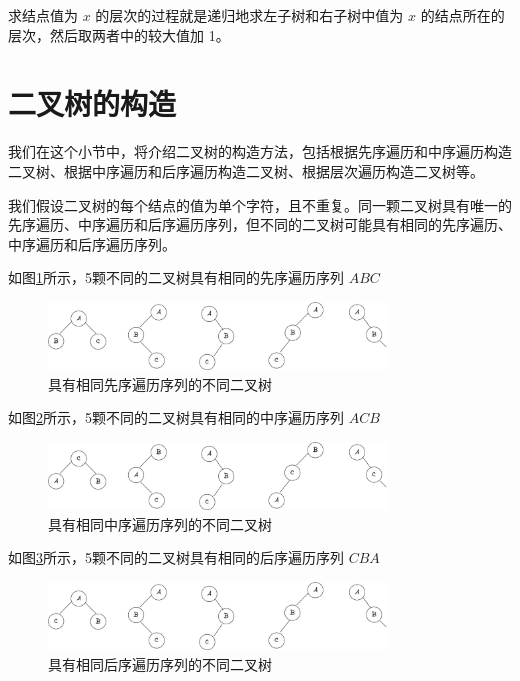 \documentclass[lang=cn,newtx,10pt,scheme=chinese]{elegantbook}
\begin{document}
求结点值为 $x$ 的层次的过程就是递归地求左子树和右子树中值为 $x$ 的结点所在的层次，然后取两者中的较大值加 1。


\section{二叉树的构造}

我们在这个小节中，将介绍二叉树的构造方法，包括根据先序遍历和中序遍历构造二叉树、根据中序遍历和后序遍历构造二叉树、根据层次遍历构造二叉树等。

我们假设二叉树的每个结点的值为单个字符，且不重复。同一颗二叉树具有唯一的先序遍历、中序遍历和后序遍历序列，但不同的二叉树可能具有相同的先序遍历、中序遍历和后序遍历序列。

如图\ref{fig:samePre}所示，5颗不同的二叉树具有相同的先序遍历序列 $ABC$

\begin{figure}[h]
  \centering
  \includegraphics[width=0.8\textwidth]{./figure/pdf/cropped/preBTree.pdf}
  \caption{具有相同先序遍历序列的不同二叉树}
  \label{fig:samePre}
\end{figure}

如图\ref{fig:sameIn}所示，5颗不同的二叉树具有相同的中序遍历序列 $ACB$

\begin{figure}[h]
  \centering
  \includegraphics[width=0.8\textwidth]{./figure/pdf/cropped/inBTree.pdf}
  \caption{具有相同中序遍历序列的不同二叉树}
  \label{fig:sameIn}
\end{figure}

如图\ref{fig:samePost}所示，5颗不同的二叉树具有相同的后序遍历序列 $CBA$

\begin{figure}[h]
  \centering
  \includegraphics[width=0.8\textwidth]{./figure/pdf/cropped/postBTree.pdf}
  \caption{具有相同后序遍历序列的不同二叉树}
  \label{fig:samePost}
\end{figure}
\end{document}
